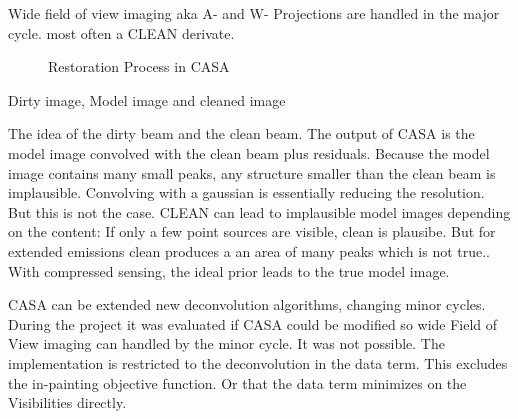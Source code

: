 Wide field of view imaging aka A- and W- Projections are handled in the major cycle.  most often a CLEAN derivate.

\begin{figure}
		\centering
		
		\caption{Restoration Process in CASA}
		\label{cs:restoreimage}
\end{figure}

Dirty image, Model image and cleaned image

The idea of the dirty beam and the clean beam. The output of CASA is the model image convolved with the clean beam plus residuals. Because the model image contains many small peaks, any structure smaller than the clean beam is implausible. Convolving with a gaussian is essentially reducing the resolution. But this is not the case. CLEAN can lead to implausible model images depending on the content: If only a few point sources are visible, clean is plausibe. But for extended emissions clean produces a an area of many peaks which is not true.. With compressed sensing, the ideal prior leads to the true model image. 

CASA can be extended new deconvolution algorithms, changing minor cycles. During the project it was evaluated if CASA could be modified so wide Field of View imaging can handled by the minor cycle. It was not possible. The implementation is restricted to the deconvolution in the data term. This excludes the in-painting objective function. Or that the data term minimizes on the Visibilities directly.




 
